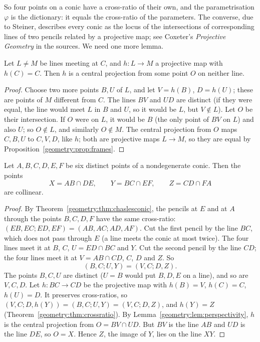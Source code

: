 So four points on a conic have a cross-ratio of their own, and the parametrisation $\varphi$ is the dictionary: it equals the cross-ratio of the
parameters. The converse, due to Steiner, describes every conic as the locus of the intersections of corresponding lines of two pencils related
by a projective map; see Coxeter's \emph{Projective Geometry} in the sources. We need one more lemma.

\begin{lemma}\label{geometry:lem:perspectivity}
Let $L\ne M$ be lines meeting at $C$, and $h:L\to M$ a projective map with $h(C)=C$. Then $h$ is a central projection from some point $O$ on neither line.
\end{lemma}

\begin{proof}
Choose two more points $B,U$ of $L$, and let $V=h(B)$, $D=h(U)$; these are points of $M$ different from $C$. The lines $BV$ and $UD$ are distinct
(if they were equal, the line would meet $L$ in $B$ and $U$, so it would be $L$, but $V\notin L$). Let $O$ be their intersection. If $O$ were on $L$, it
would be $B$ (the only point of $BV$ on $L$) and also $U$; so $O\notin L$, and similarly $O\notin M$. The central projection from $O$ maps $C,B,U$ to
$C,V,D$, like $h$; both are projective maps $L\to M$, so they are equal by Proposition~\ref{geometry:prop:frames}.
\end{proof}

\begin{theorem}[Pascal]\label{geometry:thm:pascal}
Let $A,B,C,D,E,F$ be six distinct points of a nondegenerate conic. Then the points
\[
X=AB\cap DE,\qquad Y=BC\cap EF,\qquad Z=CD\cap FA
\]
are collinear.
\end{theorem}

\begin{proof}
By Theorem~\ref{geometry:thm:chaslesconic}, the pencils at $E$ and at $A$ through the points $B,C,D,F$ have the same cross-ratio:
$(EB,EC;ED,EF)=(AB,AC;AD,AF)$. Cut the first pencil by the line $BC$, which does not pass through $E$ (a line meets the conic at most twice). The four
lines meet it at $B$, $C$, $U=ED\cap BC$ and $Y$. Cut the second pencil by the line $CD$; the four lines meet it at $V=AB\cap CD$, $C$, $D$ and $Z$. So
\[
(B,C;U,Y)=(V,C;D,Z).
\]
The points $B,C,U$ are distinct ($U=B$ would put $B,D,E$ on a line), and so are $V,C,D$. Let $h:BC\to CD$ be the projective map with $h(B)=V$, $h(C)=C$,
$h(U)=D$. It preserves cross-ratios, so $(V,C;D,h(Y))=(B,C;U,Y)=(V,C;D,Z)$, and $h(Y)=Z$ (Theorem~\ref{geometry:thm:crossratio}). By
Lemma~\ref{geometry:lem:perspectivity}, $h$ is the central projection from $O=BV\cap UD$. But $BV$ is the line $AB$ and $UD$ is the line $DE$, so $O=X$. Hence
$Z$, the image of $Y$, lies on the line $XY$.
\end{proof}


